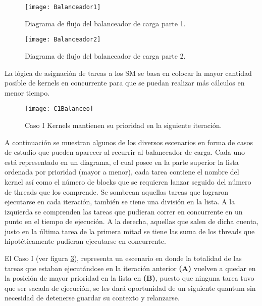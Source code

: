     \begin{figure}[!]
      \centering
        \texttt{[image: Balanceador1]}
        \caption{Diagrama de flujo del balanceador de carga parte 1.}
        \label{fig:Balanceador1}
    \end{figure}
    
    \begin{figure}[!]
      \centering
        \texttt{[image: Balanceador2]}
        \caption{Diagrama de flujo del balanceador de carga parte 2.}
        \label{fig:Balanceador2}
    \end{figure}

    

La lógica de asignación de tareas a los SM se basa en colocar la mayor cantidad posible de kernels en concurrente para que se puedan realizar más cálculos en menor tiempo.
\newline

    \begin{figure}[!]
      \centering
        \texttt{[image: C1Balanceo]}
        \caption{Caso I Kernels mantienen su prioridad en la siguiente iteración.}
        \label{fig:C1Balanceo}
    \end{figure}

A continuación se muestran algunos de los diversos escenarios en forma de casos de estudio que pueden aparecer al recurrir al balanceador de carga. Cada uno está representado en un diagrama, el cual posee en la parte superior la lista ordenada por prioridad (mayor a menor), cada tarea contiene el nombre del kernel así como el número de blocks que se requieren lanzar seguido del número de threads que los comprende. Se sombrean aquellas tareas que lograron ejecutarse en cada iteración, también se tiene una división en la lista. A la izquierda se comprenden las tareas que pudieran correr en concurrente en un punto en el tiempo de ejecución. A la derecha, aquellas que salen de dicha cuenta, justo en la última tarea de la primera mitad se tiene las suma de los threads que hipotéticamente pudieran ejecutarse en concurrente.
\newline

El Caso I (ver figura \ref{fig:C1Balanceo}), representa un escenario en donde la totalidad de las tareas que estaban ejecutándose en la iteración anterior \textbf{(A)} vuelven a quedar en la posición de mayor prioridad en la lista en \textbf{(B)}, puesto que ninguna tarea tuvo que ser sacada de ejecución, se les dará oportunidad de un siguiente quantum sin necesidad de detenerse guardar su contexto y relanzarse.
    \newline
    
